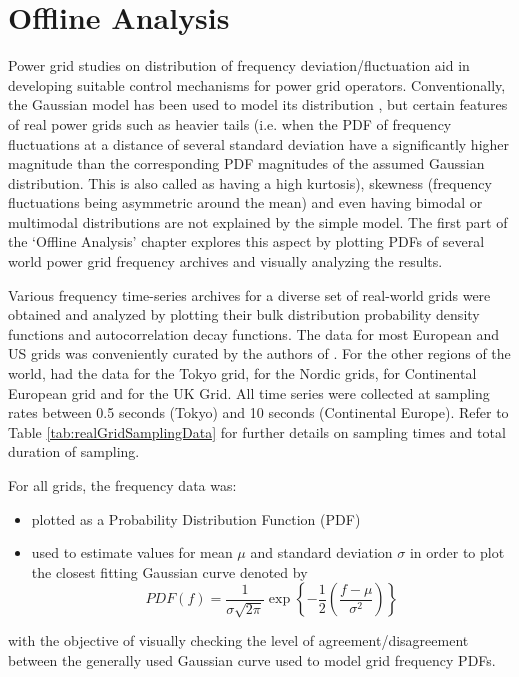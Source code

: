 \section[Offline/Postmortem Analysis]{Offline Analysis}
\label{sec:offline}

Power grid studies on distribution of frequency deviation/fluctuation aid in developing suitable control mechanisms for power grid operators. Conventionally, the Gaussian model has been used to model its distribution \cite{woodAndWollenbergPowerGenerationOperationAndControl}, but certain features of real power grids such as heavier tails (i.e. when the PDF of frequency fluctuations at a distance of several standard deviation have a significantly higher magnitude than the corresponding PDF magnitudes of the assumed Gaussian distribution. This is also called as having a high kurtosis), skewness (frequency fluctuations being asymmetric around the mean) and even having bimodal or multimodal distributions are not explained by the simple model. The first part of the `Offline Analysis' chapter explores this aspect by plotting PDFs of several world power grid frequency archives and visually analyzing the results.
 
Various frequency time-series archives for a diverse set of real-world grids were obtained and analyzed by plotting their bulk distribution probability density functions and autocorrelation decay functions. The data for most European and US grids was conveniently curated by the authors of \cite{lrydin01, lrydinGithub}. For the other regions of the world, \cite{tokyo2017, tokyo2020} had the data for the Tokyo grid, \cite{nordic2018, nordic2019} for the Nordic grids, \cite{ce2019, ce2020} for Continental European grid and \cite{ukNationalGridESOData} for the UK Grid.
All time series were collected at sampling rates between 0.5 seconds (Tokyo) and 10 seconds (Continental Europe). Refer to Table \ref{tab:realGridSamplingData} for further details on sampling times and total duration of sampling.

\renewcommand{\arraystretch}{1.0}




For all grids, the frequency data was:
\begin{itemize}
	\item plotted as a Probability Distribution Function (PDF)
	\item used to estimate values for mean $\mu$ and standard deviation $\sigma$ in order to plot the closest fitting Gaussian curve denoted by
	\begin{equation}
		PDF(f) = \frac{1}{\sigma \sqrt{2\pi}}\exp{\left\{-\frac{1}{2}\left(\frac{f-\mu}{\sigma^2}\right)\right\}}
	\end{equation}
\end{itemize}
with the objective of visually checking the level of agreement/disagreement between the generally used Gaussian curve used to model grid frequency PDFs.

